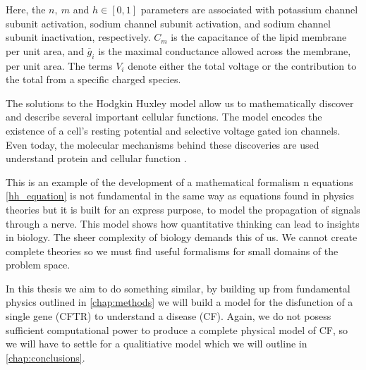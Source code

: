 Here, the $n,\ m$ and $h \in [0,1]$ parameters are associated with potassium channel subunit activation, sodium channel subunit activation, and sodium channel subunit inactivation, respectively. $C_m$ is the capacitance of the lipid membrane per unit area, and $\bar{g}_i$ is the maximal conductance allowed across the membrane, per unit area. The terms $V_i$ denote either the total voltage or the contribution to the total from a specific charged species.

The solutions to the Hodgkin Huxley model allow us to mathematically discover and describe several important cellular functions. The model encodes the existence of a cell's resting potential and selective voltage gated ion channels. Even today, the molecular mechanisms behind these discoveries are used understand protein and cellular function \cite{}. 

This is an example of the development of a mathematical formalism n equations \ref{hh_equation} is not fundamental in the same way as equations found in physics theories but it is built for an express purpose, to model the propagation of signals through a nerve. This model shows how quantitative thinking can lead to insights in biology. The sheer complexity of biology demands this of us. We cannot create complete theories so we must find useful formalisms for small domains of the problem space.

In this thesis we aim to do something similar, by building up from fundamental physics outlined in \ref{chap:methods} we will build a model for the disfunction of a single gene (CFTR) to understand a disease (CF). Again, we do not posess sufficient computational power to produce a complete physical model of CF, so we will have to settle for a qualitiative model which we will outline in \ref{chap:conclusions}. 


